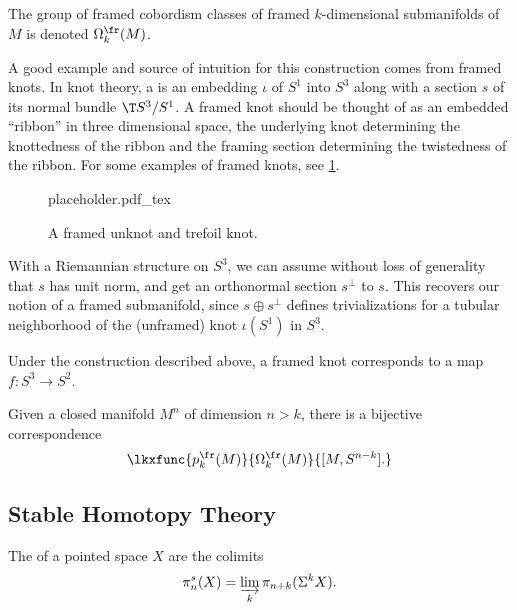 \begin{definition}
	The group of framed cobordism classes of framed $k$-dimensional submanifolds of $M$ is denoted $\Omega^\fr_k(M)$.
\end{definition}

A good example and source of intuition for this construction comes from framed knots. In knot theory, a  is an embedding $\iota$ of $S^1$ into $S^3$ along with a section $s$ of its normal bundle $\T S^3/S^1$. A framed knot should be thought of as an embedded ``ribbon'' in three dimensional space, the underlying knot determining the knottedness of the ribbon and the framing section determining the twistedness of the ribbon. For some examples of framed knots, see \cref{fig:framed-knot-examples}.

\begin{figure}[ht]
	\centering
	{placeholder.pdf_tex}
	\caption{A framed unknot and trefoil knot.}\label{fig:framed-knot-examples}
\end{figure}

\begin{remark}
	With a Riemannian structure on $S^3$, we can assume without loss of generality that $s$ has unit norm, and get an orthonormal section $s^\perp$ to $s$. This recovers our notion of a framed submanifold, since $s\oplus s^\perp$ defines trivializations for a tubular neighborhood of the (unframed) knot $\iota(S^1)$ in $S^3$.
\end{remark}

Under the construction described above, a framed knot corresponds to a map $f : S^3\to S^{2}$.

\begin{theorem}\label{thm:thom-pontryagin-isomorphism}
	Given a closed manifold $M^n$ of dimension $n>k$, there is a bijective correspondence
	\begin{equation}
		\lkxfunc{p^\fr_k(M)}{\Omega^\fr_k(M)}{{}[M, S^{n-k}].}
	\end{equation}
\end{theorem}

\subsection{Stable Homotopy Theory}

\begin{definition}
	The  of a pointed space $X$ are the colimits
	\[
		\pi_n^{s}(X) = \varinjlim_k \pi_{n+k}(\Sigma^k X).
	\]
\end{definition}

